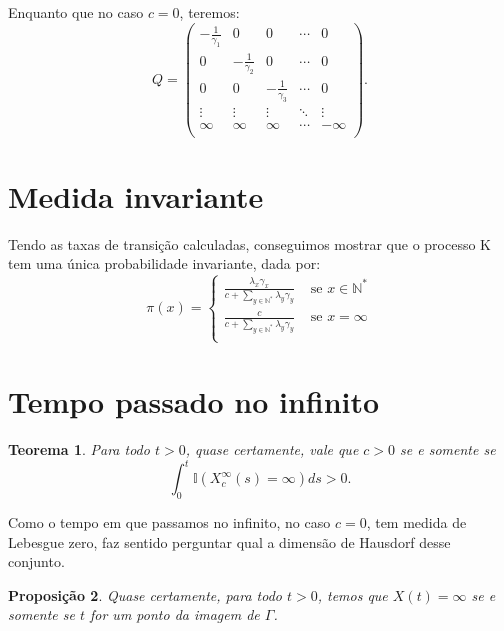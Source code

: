 \documentclass[11pt,twoside,a4paper]{article}
\newcommand{\Nz}{{\mathbb{N^*}}}
\newcommand{\ind}{{\mathbb{I}}}
\newtheorem{teorema}{Teorema}[section]
\newtheorem{proposicao}[teorema]{Proposição}
\begin{document}
Enquanto que no caso $c=0$, teremos:
\begin{displaymath}
  Q = \left(
    \begin{array}{ccccc}
      -\frac{1}{\gamma_1} & 0 & 0 & \cdots & 0\\
      0 & -\frac{1}{\gamma_2} & 0 & \cdots & 0\\
      0 & 0 & -\frac{1}{\gamma_3} & \cdots & 0\\
      \vdots & \vdots & \vdots & \ddots & \vdots \\
      \infty & \infty & \infty & \cdots & -\infty\\
    \end{array}
  \right).
\end{displaymath}

\section{Medida invariante}
\label{sec:invariante}

Tendo as taxas de transição calculadas, conseguimos mostrar que o
processo K tem uma única probabilidade invariante, dada por:
\begin{equation}
  \label{eq:invariante}
  \pi(x) = \begin{cases}
    \frac{\lambda_x \gamma_x}{c + \sum_{y \in \Nz} \lambda_y \gamma_y}
    & \textrm{ se } x \in \Nz \\
    \frac{c}{c + \sum_{y \in \Nz} \lambda_y \gamma_y}
    & \textrm{ se } x = \infty \\
  \end{cases}
\end{equation}


\section{Tempo passado no infinito}

\begin{teorema}
  Para todo $t > 0$, quase certamente, vale que $c > 0$ se e somente se 
  \begin{displaymath}
    \int_0^t \ind (X^\infty_c(s) = \infty) ds > 0.
  \end{displaymath}
\end{teorema}

Como o tempo em que passamos no infinito, no caso $c = 0$, tem medida
de Lebesgue zero, faz sentido perguntar qual a dimensão de Hausdorf
desse conjunto.

\begin{proposicao}
  Quase certamente, para todo $t > 0$, temos que $X(t) = \infty$ se e
  somente se $t$ for um ponto da imagem de $\Gamma$.
\end{proposicao}
\end{document}
